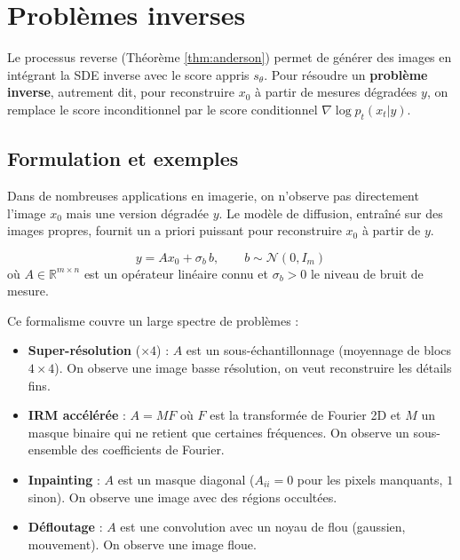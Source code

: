 \documentclass[12pt]{article}
\begin{document}
\section{Problèmes inverses}

Le processus reverse (Théorème \ref{thm:anderson}) permet de générer des images en intégrant la SDE inverse avec le score appris $s_\theta$. Pour résoudre un \textbf{problème inverse}, autrement dit, pour reconstruire $x_0$ à partir de mesures dégradées $y$, on remplace le score inconditionnel par le score conditionnel $\nabla \log p_t(x_t | y)$. 



\subsection{Formulation et exemples}

Dans de nombreuses applications en imagerie, on n'observe pas directement l'image $x_0$ mais une version dégradée $y$. Le modèle de diffusion, entraîné sur des images propres, fournit un a priori puissant pour reconstruire $x_0$ à partir de $y$.

\begin{definitionbox}
\label{def:inverse}
\begin{equation}
    y = Ax_0 + \sigma_b\, b, \qquad b \sim \mathcal{N}(0, I_m)
\end{equation}
où $A \in \mathbb{R}^{m \times n}$ est un opérateur linéaire connu et $\sigma_b > 0$ le niveau de bruit de mesure.
\end{definitionbox}

Ce formalisme couvre un large spectre de problèmes :
\begin{itemize}
    \item \textbf{Super-résolution} ($\times 4$) : $A$ est un sous-échantillonnage (moyennage de blocs $4 \times 4$). On observe une image basse résolution, on veut reconstruire les détails fins.
    \item \textbf{IRM accélérée} : $A = MF$ où $F$ est la transformée de Fourier 2D et $M$ un masque binaire qui ne retient que certaines fréquences. On observe un sous-ensemble des coefficients de Fourier.
    \item \textbf{Inpainting} : $A$ est un masque diagonal ($A_{ii} = 0$ pour les pixels manquants, $1$ sinon). On observe une image avec des régions occultées.
    \item \textbf{Défloutage} : $A$ est une convolution avec un noyau de flou (gaussien, mouvement). On observe une image floue.
\end{itemize}
\end{document}
